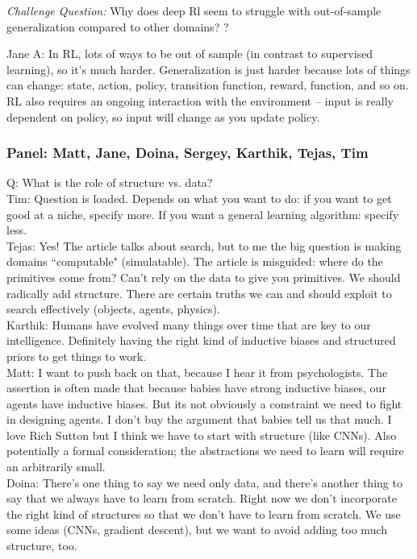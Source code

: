 {\it Challenge Question:} Why does deep Rl seem to struggle with out-of-sample generalization compared to other domains? ?

Jane A: In RL, lots of ways to be out of sample (in contrast to supervised learning), so it's much harder. Generalization is just harder because lots of things can change: state, action, policy, transition function, reward, function, and so on. RL also requires an ongoing interaction with the environment -- input is really dependent on policy, so input will change as you update policy.

\subsubsection{Panel: Matt, Jane, Doina, Sergey, Karthik, Tejas, Tim}
\label{sec:panel}
Q: What is the role of structure vs. data? \\

Tim: Question is loaded. Depends on what you want to do: if you want to get good at a niche, specify more. If you want a general learning algorithm: specify less. \\

Tejas: Yes! The article talks about search, but to me the big question is making domains ``computable" (simulatable). The article is misguided: where do the primitives come from? Can't rely on the data to give you primitives. We should radically add structure. There are certain truths we can and should exploit to search effectively (objects, agents, physics). \\

Karthik: Humans have evolved many things over time that are key to our intelligence. Definitely having the right kind of inductive biases and structured priors to get things to work.  \\

Matt: I want to push back on that, because I hear it from psychologists. The assertion is often made that because babies have strong inductive biases, our agents have inductive biases. But its not obviously a constraint we need to fight in designing agents. I don't buy the argument that babies tell us that much. I love Rich Sutton but I think we have to start with structure (like CNNs). Also potentially a formal consideration; the abstractions we need to learn will require an arbitrarily small. \\

Doina: There's one thing to say we need only data, and there's another thing to say that we always have to learn from scratch. Right now we don't incorporate the right kind of structures so that we don't have to learn from scratch. We use some ideas (CNNs, gradient descent), but we want to avoid adding too much structure, too. \\

